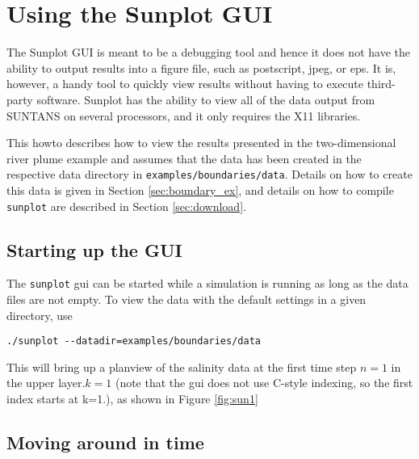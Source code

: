 \section{Using the Sunplot GUI}

The Sunplot GUI is meant to be a debugging tool and hence it does not have the ability to output
results into a figure file, such as postscript, jpeg, or eps.  It is, however, a handy tool to
quickly view results without having to execute third-party software.  Sunplot has the ability to
view all of the data output from SUNTANS on several processors, and it only requires the X11 libraries.

This howto describes how to view the results presented in the two-dimensional river plume
example and assumes that the data has been created in the respective data directory
in \verb+examples/boundaries/data+.  Details on how to create this data is given in 
Section \ref{sec:boundary_ex},
and details on how to compile \verb+sunplot+ are described in Section \ref{sec:download}.

\subsection{Starting up the GUI}

The \verb+sunplot+ gui can be started while a simulation is running as long as the data files
are not empty.  To view the data with the default settings in a given directory, use
\begin{verbatim}
./sunplot --datadir=examples/boundaries/data
\end{verbatim}
This will bring up a planview of the salinity data at the first time step $n=1$ in the upper layer.$k=1$ (note
that the gui does not use C-style indexing, so the first index starts at k=1.), as shown in Figure
\ref{fig:sun1}

\subsection{Moving around in time}

